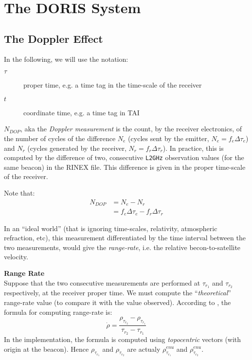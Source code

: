 \chapter{The DORIS System}
\label{ch:doris-system}

\section{The Doppler Effect}
\label{sec:doppler-effect}

In the following, we will use the notation:
\begin{description}
  \item[$\tau$] proper time, e.g. a time tag in the time-scale of the receiver
  \item[$t$] coordinate time, e.g. a time tag in TAI
\end{description}

$N_{DOP}$, aka the \emph{Doppler measurement} is the count, by the receiver 
electronics, of the number of cycles of the difference $N_e$ (cycles sent by the 
emitter, $N_e=f_e \Delta \tau_e$) and $N_r$ (cycles generated by the receiver, 
$N_r=f_r \Delta \tau_r$). In practice, this is computed by the difference of two, 
consecutive \texttt{L2GHz} observation values (for the same beacon) in the RINEX file.
This difference is given in the proper time-scale of the receiver.

Note that:
\begin{equation}
  \begin{split}
    N_{DOP} & = N_e - N_r\\
            & = f_e \Delta\tau_e - f_r \Delta\tau_r
  \end{split}
\end{equation}

In an ``ideal world'' (that is ignoring time-scales, relativity, atmospheric 
refraction, etc), this measurement differentiated by the time interval between the 
two measurements, would give the \emph{range-rate}, i.e. the relative becon-to-satellite 
velocity.

\textbf{Range Rate}\\
\label{range-rate}
Suppose that the two consecutive measurements are performed at $\tau_{r_1}$ 
and $\tau_{r_2}$ respectively, at the receiver proper time. We must compute the 
``\emph{theoretical}'' range-rate value (to compare it with the value observed).
According to \cite{Montenbruck2000}, the formula for computing range-rate is:
\begin{equation}
  \dot{\rho} = \frac{\rho_{\tau_{r_2}} - \rho_{\tau_{r_1}}}{\tau_{r_2} - \tau_{r_1}}
\end{equation}
In the implementation, the formula is computed using \emph{topocentric} vectors 
(with origin at the beacon). Hence $\rho_{\tau_{r_1}}$ and $\rho_{\tau_{r_2}}$ are 
actualy $\rho_{\tau_{r_1}}^{enu}$ and $\rho_{\tau_{r_2}}^{enu}$.

